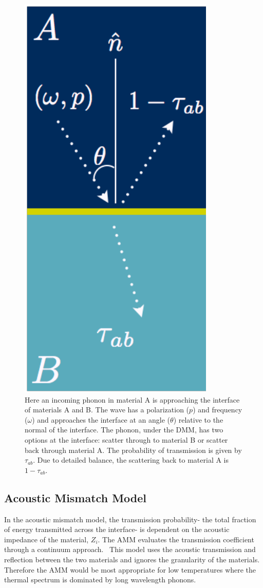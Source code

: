 \begin{figure}
    \centering
    \includegraphics[scale=0.75]{figures/interface-graphic.png}
    \caption{Here an incoming phonon in material A is approaching the interface of materials A and B. The wave has a polarization ($p$) and frequency ($\omega$) and approaches the interface at an angle ($\theta$) relative to the normal of the interface. The phonon, under the DMM, has two options at the interface: scatter through to material B or scatter back through material A. The probability of transmission is given by $\tau_{ab}$. Due to detailed balance, the scattering back to material A is $1 - \tau_{ab}$.}
    \label{fig:interface-graphic}
\end{figure}

\subsection{Acoustic Mismatch Model}
In the acoustic mismatch model, the transmission probability- the total fraction of energy transmitted across the interface- is dependent on the acoustic impedance of the material, $Z_i$. The AMM evaluates the transmission coefficient through a continuum approach.~\cite{Little1959} This model uses the acoustic transmission and reflection between the two materials and ignores the granularity of the materials. Therefore the AMM would be most appropriate for low temperatures where the thermal spectrum is dominated by long wavelength phonons.~\cite{Graff1975} 

